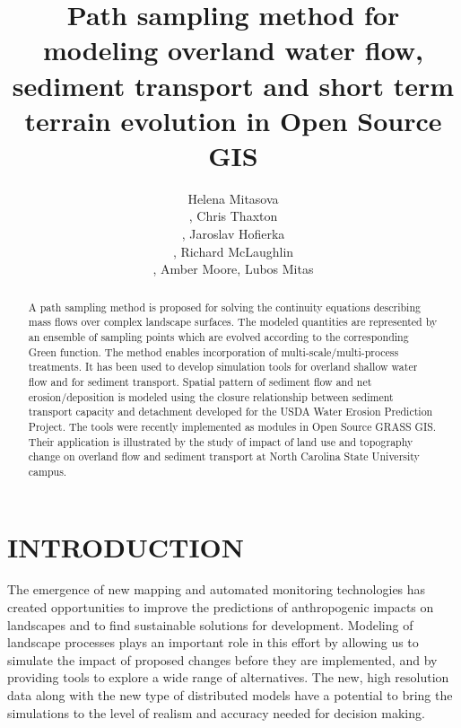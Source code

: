 \documentclass[fleqn,12pt,twoside]{article}
\title{
Path sampling method for modeling overland water flow, sediment
transport and short term terrain evolution in Open Source GIS}
\author{Helena Mitasova\address{
Department of Marine, Earth and Atmospheric Sciences
North Carolina State University
1125 Jordan Hall, Raleigh, NC 27695, USA},
Chris Thaxton\address[DPNCSU]{Department of Physics, North Carolina State University,
Raleigh, NC 27695, USA},
Jaroslav Hofierka\address{Department of Geography and Geoecology, Presov University,
Presov, Slovakia},
Richard McLaughlin\address[DSS]{Department of Soil Science,
North Carolina State University, Raleigh, NC 27695, USA},
Amber Moore\addressmark[DSS],
Lubos Mitas \addressmark[DPNCSU]}
\begin{document}
\maketitle

\begin{abstract}
A path sampling method is proposed 
for solving the continuity equations describing mass flows over complex landscape 
surfaces. The modeled quantities are
represented by an ensemble of sampling points which are evolved according to
the corresponding Green function. The method enables incorporation of
multi-scale/multi-process treatments. It has been used to develop simulation 
tools for overland shallow water flow and for sediment transport. Spatial
pattern of sediment flow and net erosion/deposition is modeled using the closure
relationship between sediment transport capacity and detachment developed for
the USDA Water Erosion Prediction Project. The tools were recently implemented
as modules in Open Source GRASS GIS. Their application is illustrated by
the study of impact of land use and topography change on overland flow and
sediment transport at North Carolina State University campus.
\end{abstract}

\section{INTRODUCTION}

The emergence of new mapping and automated monitoring technologies has created
opportunities to improve the predictions of anthropogenic impacts on landscapes
and to find sustainable solutions for development. Modeling of landscape processes 
plays an important role in this effort by allowing us to simulate the impact of proposed changes
before they are implemented, and by providing tools to explore
a wide range of alternatives. The new, high resolution data along with
the new type of distributed models have a potential to bring the simulations
to the level of realism and accuracy needed for decision making.
\end{document}
